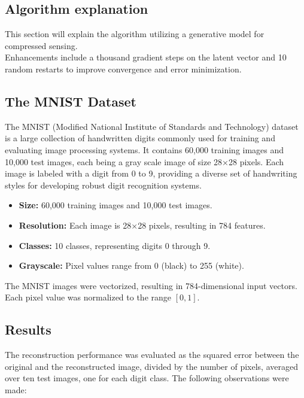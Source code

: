 \subsection{Algorithm explanation}

This section will explain the algorithm utilizing a generative model for compressed sensing.
\\
Enhancements include a thousand gradient steps on the latent vector and 10 random restarts to improve convergence and error minimization.



\subsection{The MNIST Dataset}

The MNIST (Modified National Institute of Standards and Technology) dataset is a large collection of handwritten digits commonly used for training and evaluating image processing systems. It contains 60,000 training images and 10,000 test images, each being a gray scale image of size 28×28 pixels. Each image is labeled with a digit from 0 to 9, providing a diverse set of handwriting styles for developing robust digit recognition systems.
\begin{itemize}
    \item \textbf{Size:} 60,000 training images and 10,000 test images.
    \item \textbf{Resolution:} Each image is 28×28 pixels, resulting in 784 features.
    \item \textbf{Classes:} 10 classes, representing digits 0 through 9.
    \item \textbf{Grayscale:} Pixel values range from 0 (black) to 255 (white).
\end{itemize}
The MNIST images were vectorized, resulting in 784-dimensional input vectors. Each pixel value was normalized to the range $[0, 1]$.



\subsection{Results}

The reconstruction performance was evaluated as the squared error between the original and the reconstructed image, divided by the number of pixels, averaged over ten test images, one for each digit class. The following observations were made:

